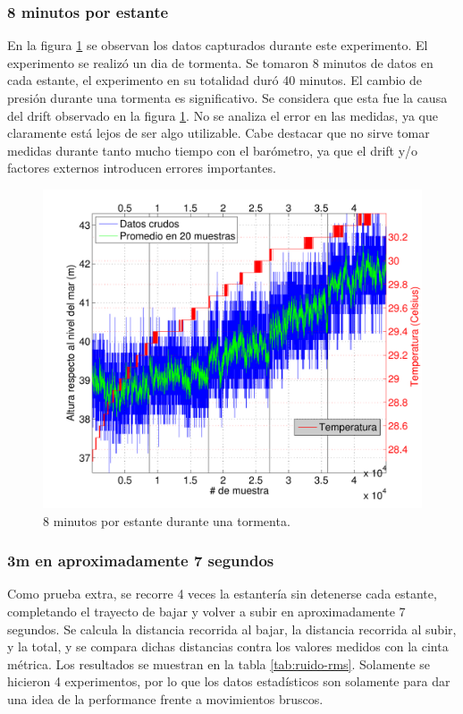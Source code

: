 \documentclass[spanish,12pt,a4paper,titlepage]{report}
\begin{document}
\subsubsection{8 minutos por estante}

En la figura \ref{fig:cm-8min-por-estante.pdf} se observan los datos capturados durante este experimento. El experimento se realizó un dia de tormenta. Se tomaron 8 minutos de datos en cada estante, el experimento en su totalidad duró 40 minutos. El cambio de presión durante una tormenta es significativo. Se considera que esta fue la causa del drift observado en la figura \ref{fig:cm-8min-por-estante.pdf}. No se analiza el error en las medidas, ya que claramente está lejos de ser algo utilizable. Cabe destacar que no sirve tomar medidas durante tanto mucho tiempo con el barómetro, ya que el drift y/o factores externos introducen errores importantes.

\begin{figure}[H]
\centering
  \includegraphics[width=1\textwidth]{./pics/cm-8min-por-estante.pdf}
  \caption{8 minutos por estante durante una tormenta.}
  \label{fig:cm-8min-por-estante.pdf}
\end{figure}

\newpage
\subsubsection{3m en aproximadamente 7 segundos}

Como prueba extra, se recorre 4 veces la estantería sin detenerse cada estante, completando el trayecto de bajar y volver a subir en aproximadamente 7 segundos. Se calcula la distancia recorrida al bajar, la distancia recorrida al subir, y la total, y se compara dichas distancias contra los valores medidos con la cinta métrica. Los resultados se muestran en la tabla \ref{tab:ruido-rms}. Solamente se hicieron 4 experimentos, por lo que los datos estadísticos son solamente para dar una idea de la performance frente a movimientos bruscos.
\end{document}
